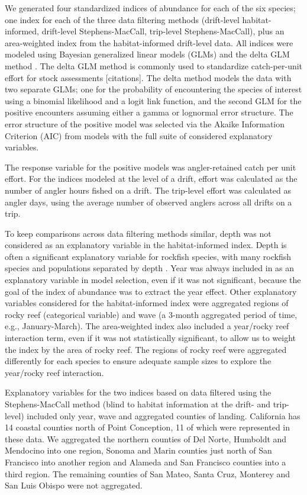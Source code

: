 \documentclass[
  12pt,
  authoryear,
  preprint,
  3p]{elsarticle}
\begin{document}
We generated four standardized indices of abundance for each of the six
species; one index for each of the three data filtering methods
(drift-level habitat-informed, drift-level Stephens-MacCall, trip-level
Stephens-MacCall), plus an area-weighted index from the habitat-informed
drift-level data. All indices were modeled using Bayesian generalized
linear models (GLMs) and the delta GLM method
\citep{Lo:1992:IRA, Stefansson:1996:AGS}. The delta GLM method is
commonly used to standardize catch-per-unit effort for stock assessments
{[}citations{]}. The delta method models the data with two separate
GLMs; one for the probability of encountering the species of interest
using a binomial likelihood and a logit link function, and the second
GLM for the positive encounters assuming either a gamma or lognormal
error structure. The error structure of the positive model was selected
via the Akaike Information Criterion (AIC) from models with the full
suite of considered explanatory variables.

The response variable for the positive models was angler-retained catch
per unit effort. For the indices modeled at the level of a drift, effort
was calculated as the number of angler hours fished on a drift. The
trip-level effort was calculated as angler days, using the average
number of observed anglers across all drifts on a trip.

To keep comparisons across data filtering methods similar, depth was not
considered as an explanatory variable in the habitat-informed index.
Depth is often a significant explanatory variable for rockfish species,
with many rockfish species and populations separated by depth
\citep{Love:2002:RNP}. Year was always included in as an explanatory
variable in model selection, even if it was not significant, because the
goal of the index of abundance was to extract the year effect. Other
explanatory variables considered for the habitat-informed index were
aggregated regions of rocky reef (categorical variable) and wave (a
3-month aggregated period of time, e.g., January-March). The
area-weighted index also included a year/rocky reef interaction term,
even if it was not statistically significant, to allow us to weight the
index by the area of rocky reef. The regions of rocky reef were
aggregated differently for each species to ensure adequate sample sizes
to explore the year/rocky reef interaction.

Explanatory variables for the two indices based on data filtered using
the Stephens-MacCall method (blind to habitat information at the drift-
and trip-level) included only year, wave and aggregated counties of
landing. California has 14 coastal counties north of Point Conception,
11 of which were represented in these data. We aggregated the northern
counties of Del Norte, Humboldt and Mendocino into one region, Sonoma
and Marin counties just north of San Francisco into another region and
Alameda and San Francisco counties into a third region. The remaining
counties of San Mateo, Santa Cruz, Monterey and San Luis Obispo were not
aggregated.
\end{document}
